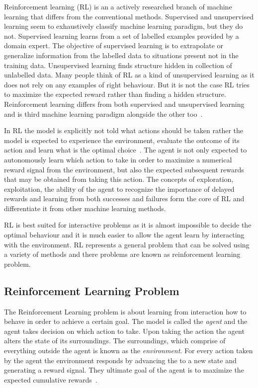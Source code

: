 Reinforcement learning (RL) is an a actively researched branch of machine learning that differs from the conventional methods. Supervised and unsupervised learning seem to exhaustively classify machine learning paradigm, but they do not. Supervised learning learns from a set of labelled examples provided by a domain expert. The objective of supervised learning is to extrapolate or generalize information from the labelled data to situations present not in the training data. Unsupervised learning finds structure hidden in collection of unlabelled data. Many people think of RL as a kind of unsupervised learning as it does not rely on any examples of right behaviour. But it is not the case RL tries to maximize the expected reward rather than finding a hidden structure. Reinforcement learning differs from both supervised and unsupervised learning and is third machine learning paradigm alongside the other too~\cite{sutton2018reinforcement}.


In RL the model is explicitly not told what actions should be taken rather the model is expected to experience the environment, evaluate the outcome of its action and learn what is the optimal choice~\cite{sutton2018reinforcement}. The agent is not only expected to autonomously learn which action to take in order to maximize a numerical reward signal from the environment, but also the expected subsequent rewards that may be obtained from taking this action. The concepts of exploration, exploitation, the ability of the agent to recognize the importance of delayed rewards and learning from both successes and failures form the core of RL and differentiate it from other machine learning methods.



RL is best suited for interactive problems as it is almost impossible to decide the optimal behaviour and it is much easier to allow the agent learn by interacting with the environment. RL represents a general problem that can be solved using a variety of methods and there problems are known as reinforcement learning problem.




\subsection{Reinforcement Learning Problem}
The Reinforcement Learning problem is about learning from interaction how to behave in order to achieve a certain goal. The model is called the \emph{agent} and the agent takes decision on which action to take. Upon taking the action the agent alters the state of its surroundings. The surroundings, which comprise of everything outside the agent is known as the \emph{environment}. For every action taken  by the agent the environment responds by advancing the to a new state and generating a reward signal. They ultimate goal of the agent is to maximize the expected cumulative rewards~\cite{kaelbling1996reinforcement}.

